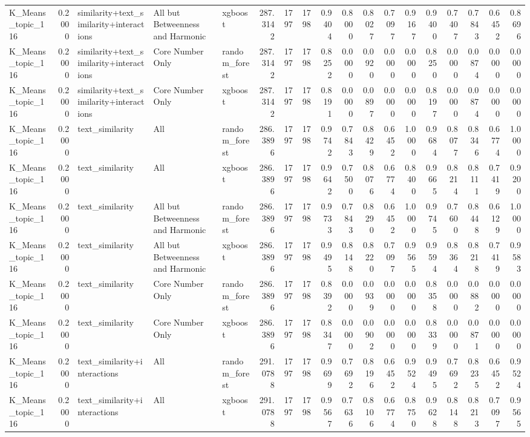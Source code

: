 \begin{tabular}{lrlllrrrrrrrrrrrrr}
K_Means_topic_116 & 0.2000 & similarity+text_similarity+interactions & All but Betweenness and Harmonic & xgboost & 287.3142 & 1797 & 1798 & 0.9404 & 0.8000 & 0.8027 & 0.7097 & 0.9167 & 0.9400 & 0.7407 & 0.7843 & 0.6452 & 0.8696 \\
K_Means_topic_116 & 0.2000 & similarity+text_similarity+interactions & Core Number Only & random_forest & 287.3142 & 1797 & 1798 & 0.8252 & 0.0000 & 0.0920 & 0.0000 & 0.0000 & 0.8250 & 0.0000 & 0.0874 & 0.0000 & 0.0000 \\
K_Means_topic_116 & 0.2000 & similarity+text_similarity+interactions & Core Number Only & xgboost & 287.3142 & 1797 & 1798 & 0.8191 & 0.0000 & 0.0897 & 0.0000 & 0.0000 & 0.8197 & 0.0000 & 0.0874 & 0.0000 & 0.0000 \\
K_Means_topic_116 & 0.2000 & text_similarity & All & random_forest & 286.3896 & 1797 & 1798 & 0.9742 & 0.7843 & 0.8429 & 0.6452 & 1.0000 & 0.9684 & 0.8077 & 0.8346 & 0.6774 & 1.0000 \\
K_Means_topic_116 & 0.2000 & text_similarity & All & xgboost & 286.3896 & 1797 & 1798 & 0.9642 & 0.7500 & 0.8076 & 0.6774 & 0.8400 & 0.9665 & 0.8214 & 0.8111 & 0.7419 & 0.9200 \\
K_Means_topic_116 & 0.2000 & text_similarity & All but Betweenness and Harmonic & random_forest & 286.3896 & 1797 & 1798 & 0.9733 & 0.7843 & 0.8290 & 0.6452 & 1.0000 & 0.9745 & 0.7600 & 0.8448 & 0.6129 & 1.0000 \\
K_Means_topic_116 & 0.2000 & text_similarity & All but Betweenness and Harmonic & xgboost & 286.3896 & 1797 & 1798 & 0.9495 & 0.8148 & 0.8220 & 0.7097 & 0.9565 & 0.9594 & 0.8364 & 0.8218 & 0.7419 & 0.9583 \\
K_Means_topic_116 & 0.2000 & text_similarity & Core Number Only & random_forest & 286.3896 & 1797 & 1798 & 0.8392 & 0.0000 & 0.0939 & 0.0000 & 0.0000 & 0.8358 & 0.0000 & 0.0882 & 0.0000 & 0.0000 \\
K_Means_topic_116 & 0.2000 & text_similarity & Core Number Only & xgboost & 286.3896 & 1797 & 1798 & 0.8347 & 0.0000 & 0.0902 & 0.0000 & 0.0000 & 0.8339 & 0.0000 & 0.0871 & 0.0000 & 0.0000 \\
K_Means_topic_116 & 0.2000 & text_similarity+interactions & All & random_forest & 291.0788 & 1797 & 1798 & 0.9699 & 0.7692 & 0.8196 & 0.6452 & 0.9524 & 0.9495 & 0.7692 & 0.8235 & 0.6452 & 0.9524 \\
K_Means_topic_116 & 0.2000 & text_similarity+interactions & All & xgboost & 291.0788 & 1797 & 1798 & 0.9567 & 0.7636 & 0.8106 & 0.6774 & 0.8750 & 0.9628 & 0.8148 & 0.8213 & 0.7097 & 0.9565 \\

\end{tabular}
